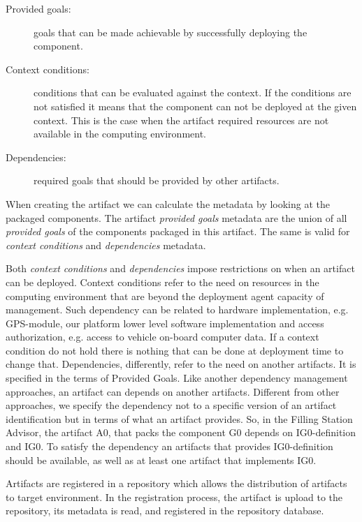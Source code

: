 \begin{description}
  \item[Provided goals:] goals that can be made achievable by successfully deploying the component.
  \item[Context conditions:] conditions that can be evaluated against the context. If the conditions are not satisfied it means that the component can not be deployed at the given context. This is the case when the artifact required resources are not available in the computing environment.
  \item[Dependencies:] required goals that should be provided by other artifacts.
\end{description}

When creating the artifact we can calculate the metadata by looking at the packaged components. The artifact \emph{provided goals} metadata are the union of all \emph{provided goals} of the components packaged in this artifact. The same is valid for \emph{context conditions} and \emph{dependencies} metadata.

Both \emph{context conditions} and \emph{dependencies} impose restrictions on when an artifact can be deployed.
Context conditions refer to the need on resources in the computing environment that are beyond the deployment agent capacity of management. Such dependency can be related to hardware implementation, e.g. GPS-module, our platform lower level software implementation and access authorization, e.g. access to vehicle on-board computer data. If a context condition do not hold there is nothing that can be done at deployment time to change that.
Dependencies, differently, refer to the need on another artifacts. It is specified in the terms of Provided Goals. Like another dependency management approaches, an artifact can depends on another artifacts.
Different from other approaches, we specify the dependency not to a specific version of an artifact identification but in terms of what an artifact provides.
So, in the Filling Station Advisor, the artifact A0, that packs the component G0 depends on IG0-definition and IG0. To satisfy the dependency an artifacts that provides IG0-definition should be available, as well as at least one artifact that implements IG0.

Artifacts are registered in a repository which allows the distribution of artifacts to target environment. In the registration process, the artifact is upload to the repository, its metadata is read, and registered in the repository database.

